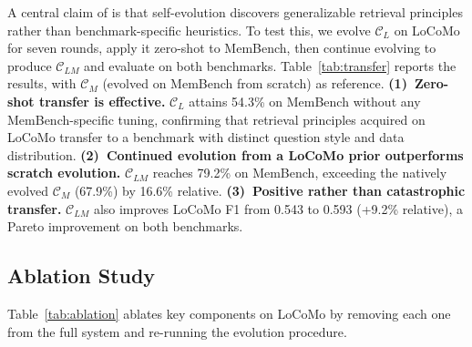 A central claim of \ours{} is that self-evolution discovers generalizable retrieval principles rather than benchmark-specific heuristics. To test this, we evolve $\mathcal{C}_L$ on LoCoMo for seven rounds, apply it zero-shot to MemBench, then continue evolving to produce $\mathcal{C}_{LM}$ and evaluate on both benchmarks. Table~\ref{tab:transfer} reports the results, with $\mathcal{C}_M$ (evolved on MemBench from scratch) as reference. \textbf{(1)~Zero-shot transfer is effective.} $\mathcal{C}_L$ attains 54.3\% on MemBench without any MemBench-specific tuning, confirming that retrieval principles acquired on LoCoMo transfer to a benchmark with distinct question style and data distribution. \textbf{(2)~Continued evolution from a LoCoMo prior outperforms scratch evolution.} $\mathcal{C}_{LM}$ reaches 79.2\% on MemBench, exceeding the natively evolved $\mathcal{C}_M$ (67.9\%) by 16.6\% relative. \textbf{(3)~Positive rather than catastrophic transfer.} $\mathcal{C}_{LM}$ also improves LoCoMo F1 from 0.543 to 0.593 (+9.2\% relative), a Pareto improvement on both benchmarks.




\subsection{Ablation Study}
\label{sec:ablation}

Table~\ref{tab:ablation} ablates key components on LoCoMo by removing each one from the full system and re-running the evolution procedure.


